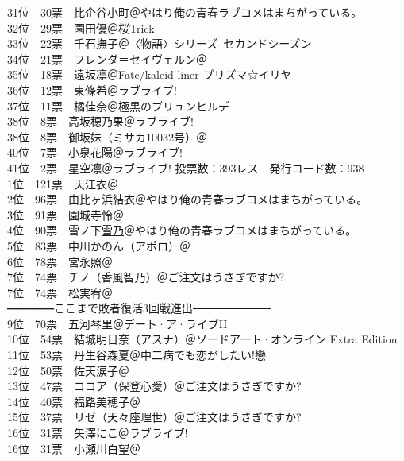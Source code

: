 {    31位　30票　比企谷小町＠やはり俺の青春ラブコメはまちがっている。\\
    32位　29票　園田優＠桜Trick\\
    33位　22票　千石撫子＠〈物語〉シリーズ~セカンドシーズン\\
    34位　21票　フレンダ＝セイヴェルン＠\Railgan\\
    35位　18票　遠坂凛＠Fate/kaleid liner プリズマ☆イリヤ\\
    36位　12票　東條希＠ラブライブ!\\
    37位　11票　橘佳奈＠極黒のブリュンヒルデ\\
    38位　8票　高坂穂乃果＠ラブライブ!\\
    38位　8票　御坂妹（ミサカ10032号）＠\Railgan\\
    40位　7票　小泉花陽＠ラブライブ!\\
    41位　2票　星空凛＠ラブライブ!
}{
    投票数：393レス　発行コード数：938\\
    1位　121票　天江衣＠\Saki\\
    2位　96票　由比ヶ浜結衣＠やはり俺の青春ラブコメはまちがっている。\\
    3位　91票　園城寺怜＠\Saki\\
    4位　90票　雪ノ下\uline{雪乃}＠やはり俺の青春ラブコメはまちがっている。\\
    5位　83票　中川かのん（アポロ）＠\Kaminomi\\
    6位　78票　宮永照＠\Saki\\
    7位　74票　チノ（香風智乃）＠ご注文はうさぎですか?\\
    7位　74票　松実宥＠\Saki\\
    ━━━━━━━ここまで敗者復活3回戦進出━━━━━━━\\
    9位　70票　五河琴里＠デート·ア·ライブII\\
    10位　54票　結城明日奈（アスナ）＠ソードアート·オンライン Extra Edition\\
    11位　53票　丹生谷森夏＠中二病でも恋がしたい!戀\\
    12位　50票　佐天涙子＠\Railgan\\
    13位　47票　ココア（保登心愛）＠ご注文はうさぎですか?\\
    14位　40票　福路美穂子＠\Saki\\
    15位　37票　リゼ（天々座理世）＠ご注文はうさぎですか?\\
    16位　31票　矢澤にこ＠ラブライブ!\\
    16位　31票　小瀬川白望＠\Saki\\
}
